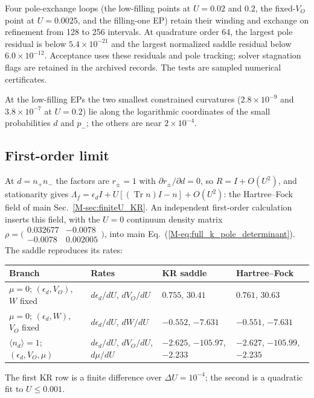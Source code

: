 \documentclass[%
  aps,physrev,onecolumn,10pt,amsmath,amssymb,superscriptaddress,longbibliography,floatfix
]{revtex4-2}
\begin{document}
Four pole-exchange loops (the low-filling points at $U=0.02$ and $0.2$,
the fixed-$V_O$ point at $U=0.0025$, and the filling-one EP) retain their
winding and exchange on refinement from 128 to 256 intervals. At quadrature
order 64, the largest pole residual is below $5.4\times10^{-21}$ and the
largest normalized saddle residual below $6.0\times10^{-12}$. Acceptance
uses these residuals and pole tracking; solver stagnation flags are retained
in the archived records. The tests are sampled numerical certificates.

At the low-filling EPs the two smallest constrained curvatures
($2.8\times10^{-9}$ and $3.8\times10^{-7}$ at $U=0.2$) lie along the
logarithmic coordinates of the small probabilities $d$ and $p_-$; the others
are near $2\times10^{-4}$.

\subsection{First-order limit}
\label{app:KR_HF}
At $d=n_+n_-$ the factors are $r_\pm=1$ with $\partial r_\pm/\partial d=0$, so
$R=I+O(U^2)$, and stationarity gives
$\Lambda_f=\epsilon_dI+U[(\operatorname{Tr}n)I-n]+O(U^2)$: the Hartree--Fock field
of main Sec.~\ref{M-sec:finiteU_KR}.  An independent first-order calculation
inserts this field, with the $U=0$ continuum density matrix $\rho=\bigl(\begin{smallmatrix}0.032677&-0.0078\\-0.0078&0.002005\end{smallmatrix}\bigr)$,
into main Eq.~(\ref{M-eq:full_k_pole_determinant}).  The saddle reproduces its
rates:
\begin{center}
\begin{tabular}{@{}llll@{}}
\toprule
Branch & Rates & KR saddle & Hartree--Fock\\
\midrule
$\mu=0$; $(\epsilon_d,V_O)$, $W$ fixed & $d\epsilon_d/dU$, $dV_O/dU$ & $0.755$, $30.41$ & $0.761$, $30.63$\\
$\mu=0$; $(\epsilon_d,W)$, $V_O$ fixed & $d\epsilon_d/dU$, $dW/dU$ & $-0.552$, $-7.631$ & $-0.551$, $-7.631$\\
$\langle n_d\rangle=1$; $(\epsilon_d,V_O,\mu)$ & $d\epsilon_d/dU$, $dV_O/dU$, $d\mu/dU$ & $-2.625$, $-105.97$, $-2.233$ & $-2.627$, $-105.99$, $-2.235$\\
\bottomrule
\end{tabular}
\end{center}
The first KR row is a finite difference over $\Delta U=10^{-4}$; the second is
a quadratic fit to $U\leq0.001$.
\end{document}

